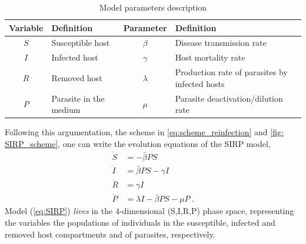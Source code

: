 \begin{table}[H]
    \centering
    \caption{Model parameters description}
    \begin{tabular}{cl:cl}
        \hline \hline
        Variable & Definition             & Parameter & Definition
        \\ \hline
        $S$      & Susceptible host       & $\beta$   & Disease transmission
        rate                                                                 \\
        $I$      & Infected host          & $\gamma$  & Host mortality rate
        \\
        $R$      & Removed host           & $\lambda$ & Production rate of
        parasites by
        infected hosts
        \\
        $P$      & Parasite in the medium & $\mu$     & Parasite
        deactivation/dilution rate
        \\ \hline \hline
    \end{tabular}
    \label{tab:parameters}
\end{table}

Following this argumentation, the scheme in \cref{eq:scheme_reinfection}
and \cref{fig: SIRP_scheme}, one can write the evolution equations of the SIRP
model,
\begin{equation}\label{eq:SIRP}
    \begin{aligned}
        \dot{S} & =-\bar{\beta} P S                    \\
        \dot{I} & =\bar{\beta} P S-\gamma I            \\
        \dot{R} & =\gamma I                            \\
        \dot{P} & =\lambda I-\bar{\beta} P S-\mu P \ .
    \end{aligned}
\end{equation}
Model (\cref{eq:SIRP})	\textit{lives} in the $4$-dimensional (S,I,R,P)
phase space, representing the variables
the populations of individuals in the susceptible, infected and removed
host compartments and of parasites, respectively.

